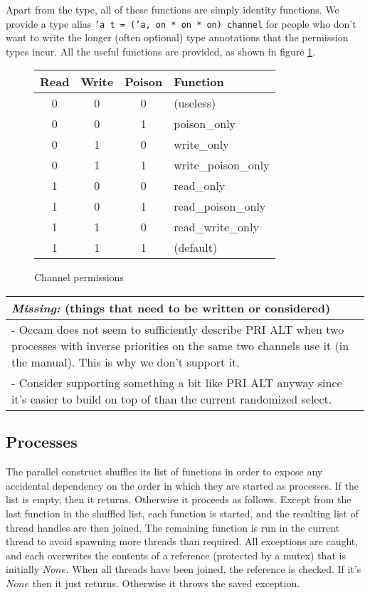 \documentclass[a4paper,12pt]{article}
\newcommand{\missing}[1]{
  \begin{tabular}{|p{11cm}|}
    \hline
    \emph{Missing:} {\scriptsize (things that need to be written or considered)} \\
    \hline
    #1
    \hline
  \end{tabular}
}
\begin{document}
Apart from the type, all of these functions are simply identity functions. We provide a
type alias \texttt{'a t = ('a, on * on * on) channel} for people who don't want to write the
longer (often optional) type annotations that the permission types incur. All
the useful functions are provided, as shown in figure \ref{channel-permissions}.

\begin{figure}[h]
\centering
\begin{tabular}{c|c|c|l}
Read & Write & Poison & Function \\
\hline
0 & 0 & 0 & (useless) \\
0 & 0 & 1 & poison\_only \\
0 & 1 & 0 & write\_only \\
0 & 1 & 1 & write\_poison\_only \\
1 & 0 & 0 & read\_only \\
1 & 0 & 1 & read\_poison\_only \\
1 & 1 & 0 & read\_write\_only \\
1 & 1 & 1 & (default) \\
\end{tabular}
\caption{Channel permissions}
\label{channel-permissions}
\end{figure}

\missing{
- Occam does not seem to sufficiently describe PRI ALT when two processes with
inverse priorities
on the same two channels use it (in the manual). This is why we don't support it. \\
- Consider supporting something a bit like PRI ALT anyway since it's easier to build on top of
than the current randomized select. \\
}

\subsection{Processes}

The parallel construct shuffles its list of functions in order to expose any
accidental dependency on the order in which they are started as processes.
If the list is empty, then it returns. Otherwise it proceeds as follows.
Except from the last function in the shuffled list, each function is started,
and the resulting list of thread handles are then joined. The remaining
function is run in the current thread to avoid spawning more threads than
required. All exceptions are caught, and each overwrites the contents of a
reference (protected by a mutex) that is initially $None$. When all threads have
been joined, the reference is checked. If it's $None$ then it just returns.
Otherwise it throws the saved exception.
\end{document}
